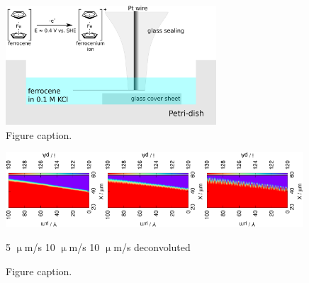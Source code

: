 \documentclass[a4paper, 11pt, oneside, bibliography=totoc]{article}
\begin{document}
\begin{figure}
\centering
\includegraphics[width=0.7\textwidth]{step.eps}
\caption{Figure caption.}
\label{fig:model1}
\end{figure} 

\begin{figure}
\centering
 \includegraphics[trim = 10mm 60mm 0mm 60mm, clip, width=0.33\textwidth, angle=-90]{1.eps}\includegraphics[trim = 10mm 60mm 0mm 60mm, clip, width=0.33\textwidth, angle=-90]{2_meandered.eps}\includegraphics[trim = 10mm 60mm 0mm 60mm, clip, width=0.33\textwidth, angle=-90]{2_meandered_deconvoluted.eps}

\hspace{1.3cm} 5 $\upmu$m/s \hspace{2.5cm} 10 $\upmu$m/s \hspace{1.2cm} 10 $\upmu$m/s deconvoluted \hfill
\caption{Figure caption.}
\label{fig:step1}
\end{figure}
\end{document}
